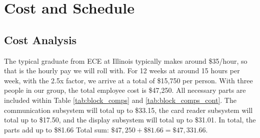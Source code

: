 \documentclass[12pt]{article}
\begin{document}
\section{Cost and Schedule}

\subsection{Cost Analysis}

The typical graduate from ECE at Illinois typically makes around \$35/hour, so that is the hourly pay we will roll with. For 12 weeks at around 15 hours per week, with the 2.5x factor, we arrive at a total of \$15,750 per person. With three people in our group, the total employee cost is \$47,250. All necessary parts are included within Table \ref{tab:block_comps} and \ref{tab:block_comps_cont}. The communication subsystem will total up to \$33.15, the card reader subsystem will total up to \$17.50, and the display subsystem will total up to \$31.01. In total, the parts add up to \$81.66
Total sum: $\$47,250+\$81.66 = \$47,331.66$.
\end{document}
